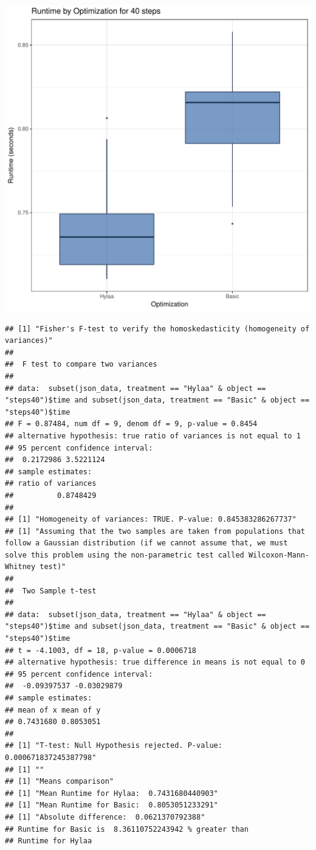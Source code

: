\documentclass{article}\usepackage[]{graphicx}\usepackage[]{color}
\makeatletter
\def\maxwidth{ %
  \ifdim\Gin@nat@width>\linewidth
    \linewidth
  \else
    \Gin@nat@width
  \fi
}
\newenvironment{kframe}{%
 \def\at@end@of@kframe{}%
 \ifinner\ifhmode%
  \def\at@end@of@kframe{\end{minipage}}%
  \begin{minipage}{\columnwidth}%
 \fi\fi%
 \def\FrameCommand##1{\hskip\@totalleftmargin \hskip-\fboxsep
 \colorbox{shadecolor}{##1}\hskip-\fboxsep
     \hskip-\linewidth \hskip-\@totalleftmargin \hskip\columnwidth}%
 \MakeFramed {\advance\hsize-\width
   \@totalleftmargin\z@ \linewidth\hsize
   \@setminipage}}%
 {\par\unskip\endMakeFramed%
 \at@end@of@kframe}
\newenvironment{knitrout}{}{} %
\makeatother
\begin{document}
\begin{knitrout}
\color{fgcolor}
\includegraphics[width=\maxwidth]{figure/RH3_steps40-1} 
\begin{kframe}\begin{verbatim}
## [1] "Fisher's F-test to verify the homoskedasticity (homogeneity of variances)"
## 
## 	F test to compare two variances
## 
## data:  subset(json_data, treatment == "Hylaa" & object == "steps40")$time and subset(json_data, treatment == "Basic" & object == "steps40")$time
## F = 0.87484, num df = 9, denom df = 9, p-value = 0.8454
## alternative hypothesis: true ratio of variances is not equal to 1
## 95 percent confidence interval:
##  0.2172986 3.5221124
## sample estimates:
## ratio of variances 
##          0.8748429 
## 
## [1] "Homogeneity of variances: TRUE. P-value: 0.845383286267737"
## [1] "Assuming that the two samples are taken from populations that follow a Gaussian distribution (if we cannot assume that, we must solve this problem using the non-parametric test called Wilcoxon-Mann-Whitney test)"
## 
## 	Two Sample t-test
## 
## data:  subset(json_data, treatment == "Hylaa" & object == "steps40")$time and subset(json_data, treatment == "Basic" & object == "steps40")$time
## t = -4.1003, df = 18, p-value = 0.0006718
## alternative hypothesis: true difference in means is not equal to 0
## 95 percent confidence interval:
##  -0.09397537 -0.03029879
## sample estimates:
## mean of x mean of y 
## 0.7431680 0.8053051 
## 
## [1] "T-test: Null Hypothesis rejected. P-value: 0.000671837245387798"
## [1] ""
## [1] "Means comparison"
## [1] "Mean Runtime for Hylaa:  0.7431680440903"
## [1] "Mean Runtime for Basic:  0.8053051233291"
## [1] "Absolute difference:  0.0621370792388"
## Runtime for Basic is  8.36110752243942 % greater than 
## Runtime for Hylaa
\end{verbatim}
\end{kframe}
\end{knitrout}
\end{document}
